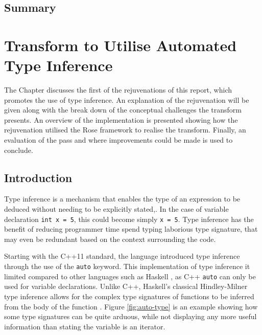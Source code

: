 \documentclass[bsc,frontabs,singlespacing,parskip,deptreport]{infthesis}
\begin{document}
\section{Summary}


\chapter{Transform to Utilise Automated Type Inference}
The Chapter discusses the first of the rejuvenations of this report, which promotes the use of type inference. An explanation of the rejuvenation will be given along with the break down of the conceptual challenges the transform presents. An overview of the implementation is presented showing how the rejuvenation utilised the Rose framework to realise the transform. Finally, an evaluation of the pass and where improvements could be made is used to conclude.

\section{Introduction}
Type inference is a mechanism that enables the type of an expression to be deduced without needing to be explicitly stated,. In the case of variable declaration \texttt{int x = 5}, this could become simply \texttt{x = 5}. Type inference has the benefit of reducing programmer time spend typing laborious type signature, that may even be redundant based on the context surrounding the code. 


Starting with the C++11 standard, the language introduced type inference through the use of the \texttt{auto} keyword. This implementation of type inference it limited compared to other languages such as Haskell \cite{LYAHFGG_Lipovaca}, as C++ \texttt{auto} can only be used for variable declarations. Unlike C++, Haskell's classical Hindley-Milner type inference allows for the complex type signatures of functions to be inferred from the body of the function \cite{HASK_TYPE_INF}. Figure \ref{fig:auto-type} is an example  showing  how some type signatures can be quite arduous, while not displaying any more useful information than stating the variable is an iterator.
\end{document}
